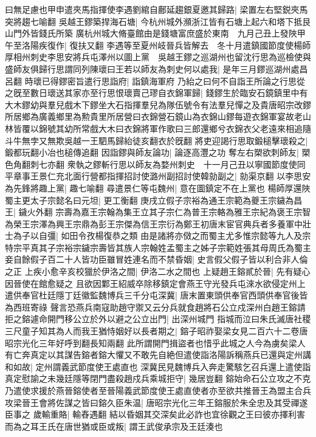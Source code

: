 曰無足慮也甲申遣夾馬指揮使李遇劉綰自鄜延趨銀夏邀其歸路|{
	梁置左右堅鋭夾馬突將趨七喻翻}
吳越王鏐築捍海石塘|{
	今杭州城外瀕浙江皆有石塘上起六和塔下抵艮山門外皆錢氏所築}
廣杭州城大脩臺館由是錢塘富庶盛於東南　九月己丑上發陜甲午至洛陽疾復作|{
	復扶又翻}
李遇等至夏州岐晉兵皆解去　冬十月遣鎮國節度使楊師厚相州刺史李思安將兵屯澤州以圖上黨　吳越王鏐之巡湖州也留沈行思為巡檢使與盛師友俱歸行思謂同列陳瓌曰王若以師友為刺史何以處我|{
	是年三月鏐巡湖州處昌呂翻}
時瓌已得鏐密旨遣行思詣府|{
	詣鎮海軍府}
乃紿之曰何不自詣王所論之行思從之旣至數日瓌送其家亦至行思恨瓌賣己璆自衣錦軍歸|{
	錢鏐生於臨安石鏡鎮里中有大木鏐幼與羣兒戲木下鏐坐大石指揮羣兒為隊伍號令有法羣兒憚之及貴唐昭宗改鏐所居鄉為廣義鄉里為勲貴里所居營曰衣錦營石鏡山為衣錦山鏐每遊衣錦軍宴故老山林皆覆以錦號其幼所常戲大木曰衣錦將軍作歌曰三郎還鄉兮衣錦衣父老遠來相追隨斗牛無孛又無欺吳越一王駟馬歸紿徒亥翻衣於旣翻}
將吏迎謁行思取鍛槌擊瓌殺之|{
	鍛都玩翻小冶也槌傳追翻}
因詣鏐與師友論功|{
	論逐高灃之功}
奪左右槊欲刺師友|{
	槊色角翻刺七亦翻}
衆執之鏐斬行思以師友為婺州刺史　十一月己丑以寧國節度使同平章事王景仁充北面行營都指揮招討使潞州副招討使韓勍副之|{
	勍渠京翻}
以李思安為先鋒將趣上黨|{
	趣七喻翻}
尋遣景仁等屯魏州|{
	意在圖鎮定不在上黨也}
楊師厚還陜　蜀主更太子宗懿名曰元坦|{
	更工衡翻}
庚戌立假子宗裕為通王宗範為夔王宗鐬為昌王|{
	鐬火外翻}
宗壽為嘉王宗翰為集王立其子宗仁為普王宗輅為雅王宗紀為褒王宗智為榮王宗澤為興王宗鼎為彭王宗傑為信王宗衍為鄭王初唐末宦官典兵者多養軍中壯士為子以自彊|{
	如田令孜楊復恭之類}
由是諸將亦傚之而蜀主尤多惟宗懿等九人及宗特宗平真其子宗裕宗鐬宗壽皆其族人宗翰姓孟蜀主之姊子宗範姓張其母周氏為蜀主妾自餘假子百二十人皆功臣雖冒姓連名而不禁昏姻|{
	史言假父假子皆以利合非人倫之正}
上疾小愈辛亥校獵於伊洛之間|{
	伊洛二水之間也}
上疑趙王鎔貳於晉|{
	先有疑心因晉使在館愈疑之}
且欲因鄴王紹威卒除移鎮定會燕王守光發兵屯淶水欲侵定州上遣供奉官杜廷隱丁廷徽監魏博兵三千分屯深冀|{
	唐末置東頭供奉官西頭供奉官後皆為西班寄祿}
聲言恐燕兵南寇助趙守禦又云分兵就食趙將石公立戍深州白趙王鎔請拒之鎔遽命開門移公立於外以避之公立出門|{
	出深州城門}
指城而泣曰朱氏滅唐社稷三尺童子知其為人而我王猶恃姻好以長者期之|{
	鎔子昭祚娶梁女見二百六十二卷唐昭宗光化三年好呼到翻長知兩翻}
此所謂開門揖盜者也惜乎此城之人今為虜矣梁人有亡奔真定以其謀告鎔者鎔大懼又不敢先自絶但遣使詣洛陽訴稱燕兵已還與定州講和如故|{
	定州謂義武節度使王處直也}
深冀民見魏博兵入奔走驚駭乞召兵還上遣使詣真定慰諭之未幾廷隱等閉門盡殺趙戍兵乘城拒守|{
	幾居豈翻}
鎔始命石公立攻之不克乃遣使求援於燕晉鎔使者至晉陽義武節度使王處直使者亦至欲共推晉王為盟主合兵攻梁晉王會將佐謀之皆曰鎔久臣朱温|{
	唐昭宗光化三年王鎔服於朱全忠及其受禪遂臣事之}
歲輸重賂|{
	輸舂遇翻}
結以昏姻其交深矣此必詐也宜徐觀之王曰彼亦擇利害而為之耳王氏在唐世猶或臣或叛|{
	謂王武俊承宗及王廷湊也}

